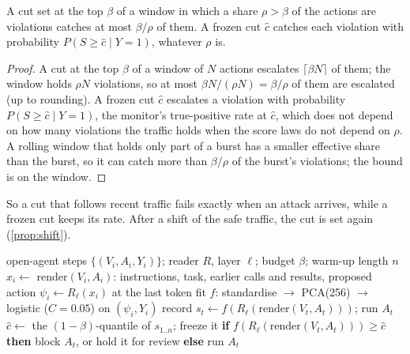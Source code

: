 \begin{proposition}[bursts]\label{prop:burst}
A cut set at the top $\beta$ of a window in which a share $\rho>\beta$ of the actions are violations catches at most $\beta/\rho$ of them. A frozen cut $\hat c$ catches each violation with probability $P(S\ge\hat c\mid Y=1)$, whatever $\rho$ is.
\end{proposition}
\begin{proof}
A cut at the top $\beta$ of a window of $N$ actions escalates $\lceil\beta N\rceil$ of them;
the window holds $\rho N$ violations, so at most $\beta N/(\rho N)=\beta/\rho$ of them are escalated (up to rounding). A frozen
cut $\hat c$ escalates a violation with probability $P(S\ge\hat c\mid Y{=}1)$, the monitor's true-positive rate at $\hat c$,
which does not depend on how many violations the traffic holds when the score laws do not depend on $\rho$. A rolling
window that holds only part of a burst has a smaller effective share than the burst, so it can catch more than $\beta/\rho$
of the burst's violations; the bound is on the window.
\end{proof}
So a cut that follows recent traffic fails exactly when an attack arrives, while a frozen cut keeps its rate. After a shift of the safe traffic, the cut is set again (\cref{prop:shift}).

\begin{algorithm}[t]
\caption{The grey-box monitor}
\label{alg:monitor}
\small
\begin{algorithmic}[1]
\REQUIRE open-agent steps $\{(V_i,A_i,Y_i)\}$; reader $R$, layer $\ell$; budget $\beta$; warm-up length $n$
\STATE $x_i\gets$ render$(V_i,A_i)$: instructions, task, earlier calls and results, proposed action
\STATE $\psi_i\gets R_\ell(x_i)$ at the last token 
\STATE fit $f$: standardise $\to$ PCA(256) $\to$ logistic ($C{=}0.05$) on $(\psi_i,Y_i)$ 
  \STATE record $s_t\gets f(R_\ell(\text{render}(V_t,A_t)))$; run $A_t$ 
\ENDFOR
\STATE $\hat c\gets$ the $(1-\beta)$-quantile of $s_{1..n}$; freeze it 
  \STATE \textbf{if} $f(R_\ell(\text{render}(V_t,A_t)))\ge\hat c$ \textbf{then} block $A_t$, or hold it for review \textbf{else} run $A_t$
\ENDFOR
\end{algorithmic}
\end{algorithm}

